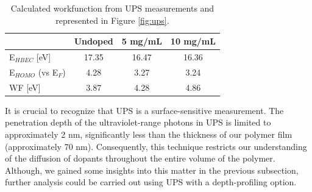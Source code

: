 \begin{table}[ht]
\centering
\caption{Calculated workfunction from UPS measurements and represented in Figure \ref{fig:ups}.}
\begin{tabular}{l|c|c|c}
& Undoped & 5 mg/mL & 10 mg/mL \\\hline
E$_{HBEC}$ [eV] & 17.35 & 16.47 & 16.36\\
E$_{HOMO}$ (vs E$_{F}$) & 4.28 & 3.27 & 3.24\\
WF [eV] & 3.87 & 4.28 & 4.86\\\hline
\end{tabular}
\label{tab:ups}
\end{table}

It is crucial to recognize that UPS is a surface-sensitive measurement. The penetration depth of the ultraviolet-range photons in UPS is limited to approximately 2 nm, significantly less than the thickness of our polymer film (approximately 70 nm). Consequently, this technique restricts our understanding of the diffusion of dopants throughout the entire volume of the polymer. Although, we gained some insights into this matter in the previous subsection, further analysis could be carried out using UPS with a depth-profiling option. 

